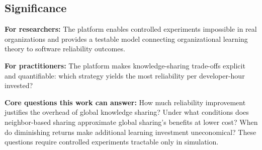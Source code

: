 \documentclass[conference,10pt]{IEEEtran}
\begin{document}
\subsection{Significance}

\textbf{For researchers:} The platform enables controlled experiments impossible in real organizations and provides a testable model connecting organizational learning theory to software reliability outcomes.

\textbf{For practitioners:} The platform makes knowledge-sharing trade-offs explicit and quantifiable: which strategy yields the most reliability per developer-hour invested?

\textbf{Core questions this work can answer:} How much reliability improvement justifies the overhead of global knowledge sharing? Under what conditions does neighbor-based sharing approximate global sharing's benefits at lower cost? When do diminishing returns make additional learning investment uneconomical? These questions require controlled experiments tractable only in simulation.
\end{document}
